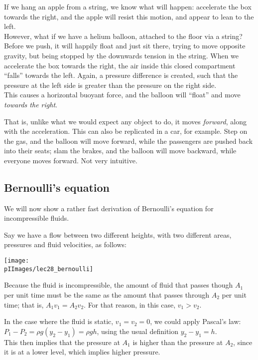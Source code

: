If we hang an apple from a string, we know what will happen: accelerate the box towards the right, and the apple will resist this motion, and appear to lean to the left.\\
However, what if we have a helium balloon, attached to the floor via a string? Before we push, it will happily float and just sit there, trying to move opposite gravity, but being stopped by the downwards tension in the string. When we accelerate the box towards the right, the air inside this closed compartment ``falls'' towards the left. Again, a pressure difference is created, such that the pressure at the left side is greater than the pressure on the right side.\\
This causes a horizontal buoyant force, and the balloon will ``float'' and move \emph{towards the right}.

That is, unlike what we would expect any object to do, it moves \emph{forward}, along with the acceleration. This can also be replicated in a car, for example. Step on the gas, and the balloon will move forward, while the passengers are pushed back into their seats; slam the brakes, and the balloon will move backward, while everyone moves forward. Not very intuitive.

\subsection{Bernoulli's equation}

We will now show a rather fast derivation of Bernoulli's equation for incompressible fluids.

Say we have a flow between two different heights, with two different areas, pressures and fluid velocities, as follows:

\begin{center}
\texttt{[image: \\pIImages/lec28\_bernoulli]}
\end{center}

Because the fluid is incompressible, the amount of fluid that passes though $A_1$ per unit time must be the same as the amount that passes through $A_2$ per unit time; that is, $A_1 v_1 = A_2 v_2$. For that reason, in this case, $v_1 > v_2$.

In the case where the fluid is static, $v_1 = v_2 = 0$, we could apply Pascal's law: $P_1 - P_2 = \rho g (y_2 - y_1) = \rho g h$, using the usual definition $y_2 - y_1 = h$.\\
This then implies that the pressure at $A_1$ is higher than the pressure at $A_2$, since it is at a lower level, which implies higher pressure.

